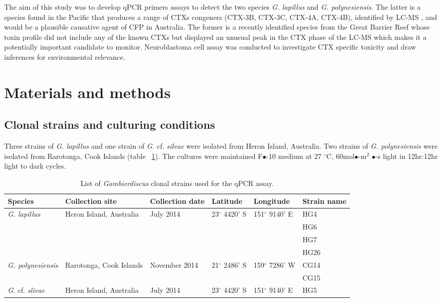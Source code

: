 \documentclass[12pt]{article}
\begin{document}
The aim of this study was to develop qPCR primers assays to detect the two species \emph{G. lapillus} and \emph{G. polynesiensis}. The latter is a species found in the Pacific that produces a range of CTXs congeners (CTX-3B, CTX-3C, CTX-4A, CTX-4B), identified by LC-MS \cite{rhodes2014production}, and would be a plausible causative agent of CFP in Australia. The former is a recently identified species from the Great Barrier Reef whose toxin profile did not include any of the known CTXs but displayed an unusual peak in the CTX phase of the LC-MS which makes it a potentially important candidate to monitor. Neuroblastoma cell assay was conducted to investigate CTX specific toxicity and draw inferences for environmental relevance.
\newpage
\section{Materials and methods}
\subsection{Clonal strains and culturing conditions}
Three strains of \emph{G. lapillus} and one strain of \emph{G.} cf. \emph{silvae} were isolated from Heron Island, Australia. Two strains of \emph{G. polynesiensis} were isolated from Rarotonga, Cook Islands (table ~\ref{tbl:StrainTable}). The cultures were maintained F$\bullet$-10 medium at 27 $^{\circ}$C, 60mol$\bullet$-m$^{2}$ $\bullet$-s light in 12hr:12hr light to dark cycles.
\FloatBarrier
\begin{table}
\caption{List of \emph{Gambierdiscus} clonal strains used for the qPCR assay.}
\label{tbl:StrainTable}
\begin{tabular}{ | p{2cm} | p{2cm} | p{2cm}| p{3cm} | p{3cm} | p{2cm} | }
\hline
\textbf{Species} & \textbf{Collection site} & \textbf{Collection date} &\textbf{Latitude} & \textbf{Longitude} & \textbf{Strain name} \\
\hline
\emph{G. lapillus} &Heron Island, Australia &July 2014 &23$^{\circ}$ 4420' S&151$^{\circ}$ 9140' E & HG4 \\
\hline
&&&&& HG6\\
\hline
&&&& &HG7\\
\hline
&&&& &HG26\\
\hline
\emph{G. polynesiensis}&Rarotonga, Cook Islands&November 2014 &21$^{\circ}$ 2486' S&159$^{\circ}$ 7286' W & CG14 \\
\hline
&&&&&CG15\\
\hline
\emph{G.} cf. \emph{slivae}&Heron Island, Australia &July 2014 &23$^{\circ}$ 4420' S&151$^{\circ}$ 9140' E& HG5\\
\hline
\end{tabular}
\end{table}
\end{document}
